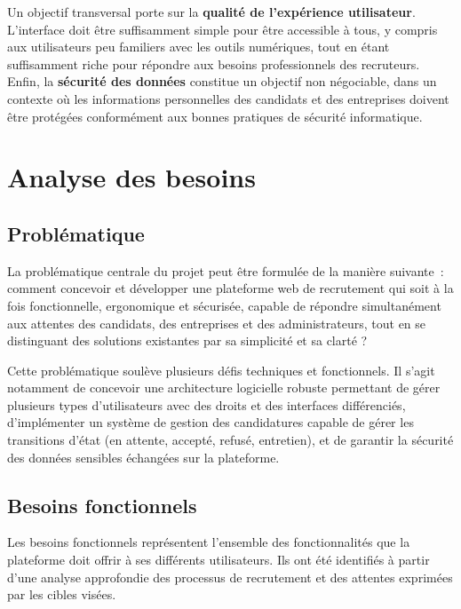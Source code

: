 \documentclass[12pt,a4paper]{report}
\begin{document}
Un objectif transversal porte sur la \textbf{qualité de l'expérience utilisateur}. L'interface doit être suffisamment simple pour être accessible à tous, y compris aux utilisateurs peu familiers avec les outils numériques, tout en étant suffisamment riche pour répondre aux besoins professionnels des recruteurs. Enfin, la \textbf{sécurité des données} constitue un objectif non négociable, dans un contexte où les informations personnelles des candidats et des entreprises doivent être protégées conformément aux bonnes pratiques de sécurité informatique.

\section{Analyse des besoins}

\subsection{Problématique}

La problématique centrale du projet peut être formulée de la manière suivante~: comment concevoir et développer une plateforme web de recrutement qui soit à la fois fonctionnelle, ergonomique et sécurisée, capable de répondre simultanément aux attentes des candidats, des entreprises et des administrateurs, tout en se distinguant des solutions existantes par sa simplicité et sa clarté ?

Cette problématique soulève plusieurs défis techniques et fonctionnels. Il s'agit notamment de concevoir une architecture logicielle robuste permettant de gérer plusieurs types d'utilisateurs avec des droits et des interfaces différenciés, d'implémenter un système de gestion des candidatures capable de gérer les transitions d'état (en attente, accepté, refusé, entretien), et de garantir la sécurité des données sensibles échangées sur la plateforme.

\subsection{Besoins fonctionnels}

Les besoins fonctionnels représentent l'ensemble des fonctionnalités que la plateforme doit offrir à ses différents utilisateurs. Ils ont été identifiés à partir d'une analyse approfondie des processus de recrutement et des attentes exprimées par les cibles visées.
\end{document}
